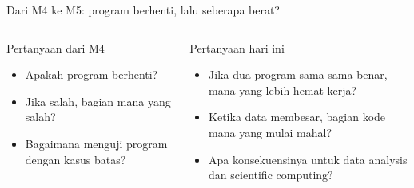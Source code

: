 \documentclass[aspectratio=169,11pt]{beamer}
\begin{document}
\begin{frame}{Dari M4 ke M5: program berhenti, lalu seberapa berat?}
\begin{columns}[T]
\begin{block}{Pertanyaan dari M4}
\begin{itemize}
\item Apakah program berhenti?
\item Jika salah, bagian mana yang salah?
\item Bagaimana menguji program dengan kasus batas?
\end{itemize}
\end{block}
\begin{block}{Pertanyaan hari ini}
\begin{itemize}
\item Jika dua program sama-sama benar, mana yang lebih hemat kerja?
\item Ketika data membesar, bagian kode mana yang mulai mahal?
\item Apa konsekuensinya untuk data analysis dan scientific computing?
\end{itemize}
\end{block}
\end{columns}
\vspace{2mm}
\begin{center}
\end{center}
\end{frame}
\end{document}
